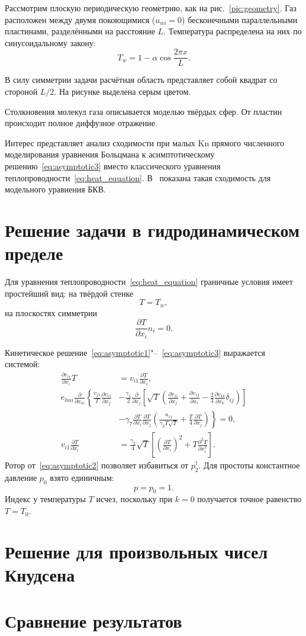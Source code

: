 \documentclass[english,russian,a4paper,12pt]{article}
\newcommand{\Kn}{\mathrm{Kn}}
\newcommand{\pder}[2][]{\frac{\partial#1}{\partial#2}}
\newcommand{\pderder}[2][]{\frac{\partial^2 #1}{\partial #2^2}}
\begin{document}
Рассмотрим плоскую периодическую геометрию, как на рис.~\ref{pic:geometry}.
Газ расположен между двумя покоющимися (\(u_{wi} = 0\)) бесконечными параллельными пластинами,
разделёнными на расстояние \(L\). Температура распределена на них по синусоидальному закону:
\begin{equation}
	T_w = 1-\alpha\cos{\frac{2\pi x}L}.
\end{equation}

В силу симметрии задачи расчётная область представляет собой квадрат со стороной \(L/2\).
На рисунке выделена серым цветом.

Столкновения молекул газа описывается моделью твёрдых сфер. От пластин происходит полное диффузное отражение. 

Интерес представляет анализ сходимости при малых \(\Kn\) прямого численного моделирования уравнения Больцмана
к асимптотическому решению~\eqref{eq:asymptotic3} вместо классического уравнения теплопроводности~\eqref{eq:heat_equation}.
В~\cite{Bobylev1996} показана такая сходимость для модельного уравнения БКВ.

\section{Решение задачи в гидродинамическом пределе}

Для уравнения теплопроводности~\eqref{eq:heat_equation} граничные условия имеет простейший вид:
на твёрдой стенке
\[ T = T_w, \]
на плоскостях симметрии
\[ \pder[T]{x_i}n_i = 0. \]

Кинетическое решение~\eqref{eq:asymptotic1}"--~\eqref{eq:asymptotic3} выражается системой:
\begin{align*}
        \pder[v_{i1}]{x_i}T &= v_{i1}\pder[T]{x_i}, \\
        e_{lmi}\pder{x_m}\left\{
		\frac{v_{j1}}{T}\pder[v_{i1}]{x_j}
		\right.&- \frac{\gamma_1}2\pder{x_j}\left[\sqrt{T}\left(\pder[v_{1i}]{x_j}+\pder[v_{1j}]{x_i}-\frac23\pder[v_{1k}]{x_k}\delta_{ij}\right)\right] \\
		&-\left. \gamma_7\pder[T]{x_i}\pder[T]{x_j}\left(\frac{u_{1j}}{\gamma_2T\sqrt{T}} + \frac{T}4\pder[T]{x_j} \right)
	\right\} = 0, \\
        v_{i1}\pder[T]{x_i} &= \frac{\gamma_2}4\sqrt{T}\left[\left(\pder[T]{x_i}\right)^2 + T\pderder[T]{x_i}\right].
\end{align*}
Ротор от~\eqref{eq:asymptotic2} позволяет избавиться от \(p_2^\dag\).
Для простоты константное давление \(p_0\) взято единичным:
\[ p = p_0 = 1. \]
Индекс у температуры \(T\) исчез, поскольку при \(k=0\) получается точное равенство \(T=T_0\).

\section{Решение для произвольных чисел Кнудсена}

\section{Сравнение результатов}

\printbibliography
\end{document}
